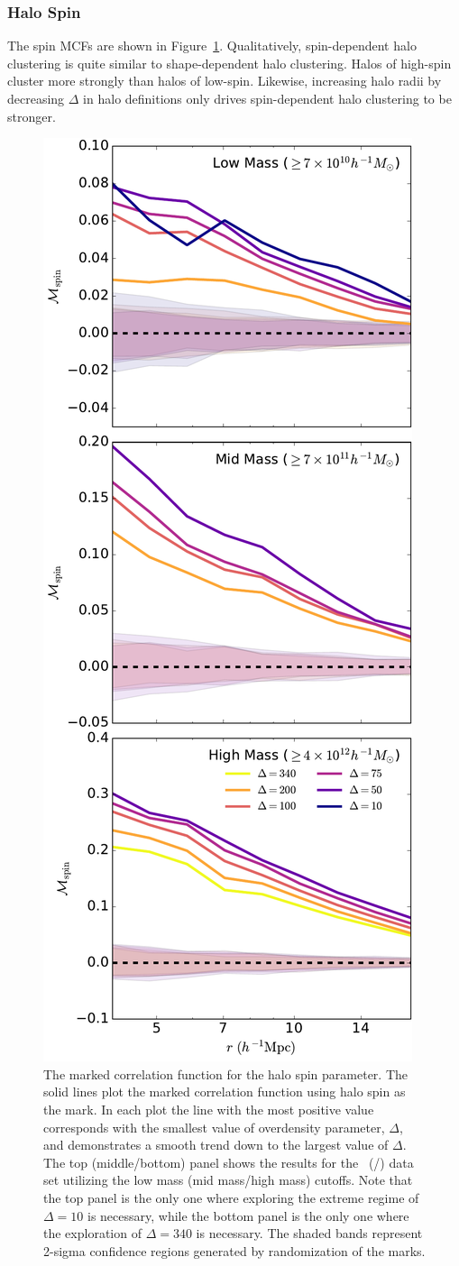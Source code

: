 \documentclass[usenatbib]{mnras}
\begin{document}
\subsubsection{Halo Spin}


The spin MCFs are shown in Figure~\ref{fig:cc_mcf_spin}. Qualitatively, spin-dependent halo clustering is 
quite similar to shape-dependent halo clustering. Halos of high-spin cluster more strongly than halos of 
low-spin.  Likewise, increasing halo radii by decreasing $\Delta$
in halo definitions only drives spin-dependent halo clustering to be stronger.


\begin{figure}
	\centering
	\includegraphics[width=.4\textwidth]{all_mcf_spin.pdf}
	\caption{The marked correlation function for the halo spin parameter. The solid lines plot the marked correlation function using halo spin as the mark. In each plot the line with the most 
positive value corresponds with the smallest value of overdensity parameter, 
$\Delta$, and demonstrates a smooth trend down to the largest value of 
$\Delta$. The top (middle/bottom) panel shows the results for the
\simA \ (\simB /\simC) data set utilizing the low mass (mid mass/high mass) cutoffs. Note
that the top panel is the only one where exploring the extreme regime of $\Delta = 10$ is
necessary, while the bottom panel is the only one where the exploration of $\Delta = 340$
is necessary. The shaded bands represent 2-sigma confidence regions generated by randomization of the marks.
	}
	\label{fig:cc_mcf_spin}
\end{figure}
\end{document}
